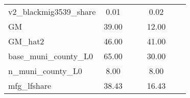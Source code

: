 \begin{table}[htbp]
\begin{tabular}{l*{2}{ccc}}
v2\_blackmig3539\_share&        0.01&            &            &        0.02&            &            \\
GM                  &       39.00&            &            &       12.00&            &            \\
GM\_hat2             &       46.00&            &            &       41.00&            &            \\
base\_muni\_county\_L0 &       65.00&            &            &       30.00&            &            \\
n\_muni\_county\_L0    &        8.00&            &            &        8.00&            &            \\
mfg\_lfshare         &       38.43&            &            &       16.43&            &            \\
\bottomrule
\end{tabular}
\end{table}
